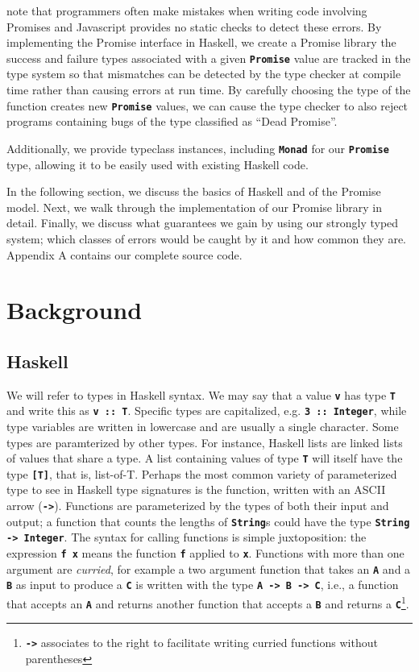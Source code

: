 \documentclass[12pt, english, letterpaper]{kuthesis}
\newcommand{\lit}[1]{\textbf{\texttt{#1}}}
\begin{document}
\cite{madsen} note that programmers often make mistakes when writing code involving \textsf{Promises} and Javascript provides no static checks to detect these errors.  By implementing the \textsf{Promise} interface in Haskell, we create a \textsf{Promise} library the success and failure types associated with a given \lit{Promise} value are tracked in the type system so that mismatches can be detected by the type checker at compile time rather than causing errors at run time.  By carefully choosing the type of the function creates new \lit{Promise} values, we can cause the type checker to also reject programs containing bugs of the type \cite{madsen} classified as ``Dead Promise''.

Additionally, we provide typeclass instances, including \lit{Monad} for our \lit{Promise} type, allowing it to be easily used with existing Haskell code.

In the following section, we discuss the basics of Haskell and of the \textsf{Promise} model.  Next, we walk through the implementation of our \textsf{Promise} library in detail.  Finally, we discuss what guarantees we gain by using our strongly typed system; which classes of errors would be caught by it and how common they are.  Appendix A contains our complete source code.
\chapter*{Background}
\section*{Haskell}
We will refer to types in Haskell syntax.  We may say that a value \lit v has type \lit T and write this as \lit{v ::\ T}.  Specific types are capitalized, e.g. \lit{3 ::\ Integer}, while type variables are written in lowercase and are usually a single character.  Some types are paramterized by other types.  For instance, Haskell lists are linked lists of values that share a type.  A list containing values of type \lit T will itself have the type \lit{[T]}, that is, list-of-T.  Perhaps the most common variety of parameterized type to see in Haskell type signatures is the function, written with an ASCII arrow (\lit{->}).  Functions are parameterized by the types of both their input and output; a function that counts the lengths of \lit{String}s could have the type \lit{String -> Integer}.  The syntax for calling functions is simple juxtoposition: the expression \lit{f x} means the function \lit f applied to \lit x.  Functions with more than one argument are \emph{curried}, for example a two argument function that takes an \lit A and a \lit B as input to produce a \lit C is written with the type \lit{A -> B -> C}, i.e.,  a function that accepts an \lit A and returns another function that accepts a \lit B and returns a \lit C\footnote{\lit{->} associates to the right to facilitate writing curried functions without parentheses}.
\end{document}
